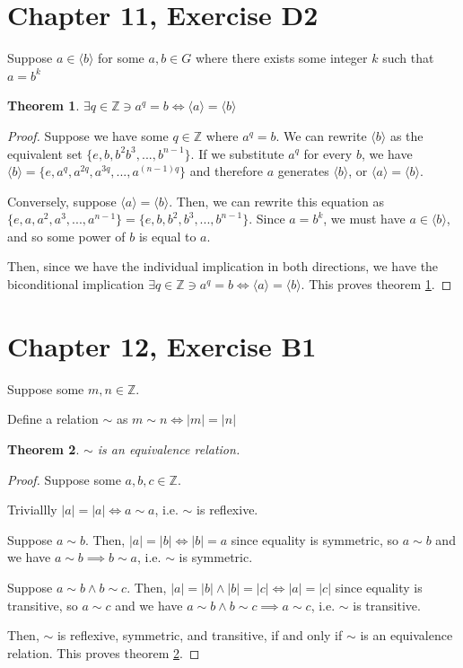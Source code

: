 \documentclass[12pt]{article}
\newcommand{\ints}{\mathbb{Z}}
\newtheorem{thm}{Theorem}
\begin{document}
\section{Chapter 11, Exercise D2}

Suppose $a \in \langle b \rangle$ for some $a,b \in G$
where there exists some integer $k$ such that $a = b^k$

\begin{thm} \label{thm12}
	$\exists q \in \ints \ni a^q = b \iff \langle a \rangle = \langle b \rangle$
\end{thm}

\begin{proof}
	Suppose we have some $q \in \ints$
	where $a^q = b$.
	We can rewrite $\langle b \rangle$
	as the equivalent set $\{ e, b, b^2 b^3, ..., b^{n-1} \}$.
	If we substitute $a^q$ for every $b$,
	we have $\langle b \rangle = \{e, a^q, a^{2q}, a^{3q}, ..., a^{(n-1)q} \}$
	and therefore $a$ generates $\langle b \rangle$,
	or $\langle a \rangle = \langle b \rangle$.

	Conversely, suppose $\langle a \rangle = \langle b \rangle$.
	Then, we can rewrite this equation as
	$\{e, a, a^2, a^3, ..., a^{n-1} \} = \{e, b, b^2, b^3, ..., b^{n-1} \}$.
	Since $a = b^k$, we must have $a \in \langle b \rangle$,
	and so some power of $b$ is equal to $a$.

	Then, since we have the individual implication in both directions,
	we have the biconditional implication
	$\exists q \in \ints \ni a^q = b \iff \langle a \rangle = \langle b \rangle$.
	This proves theorem \ref{thm12}.
\end{proof}

\section{Chapter 12, Exercise B1}

Suppose some $m,n \in \ints$.

Define a relation $\sim$ as $m \sim n \iff |m| = |n|$

\begin{thm} \label{thm9}
	$\sim$ is an equivalence relation.
\end{thm}

\begin{proof}
	Suppose some $a,b,c \in \ints$.

	Triviallly $|a| = |a| \iff a \sim a$,
	i.e. $\sim$ is reflexive.

	Suppose $a \sim b$.
	Then, $|a| = |b| \iff |b| = a$
	since equality is symmetric,
	so $a \sim b$
	and we have $a \sim b \implies b \sim a$,
	i.e. $\sim$ is symmetric.

	Suppose $a \sim b \land b \sim c$.
	Then, $|a| = |b| \land |b| = |c| \iff |a| = |c|$
	since equality is transitive,
	so $a \sim c$
	and we have $a \sim b \land b \sim c \implies a \sim c$,
	i.e. $\sim$ is transitive.

	Then,
	$\sim$ is
	reflexive,
	symmetric,
	and transitive,
	if and only if
	$\sim$ is an equivalence relation.
	This proves theorem \ref{thm9}.
\end{proof}
\end{document}
